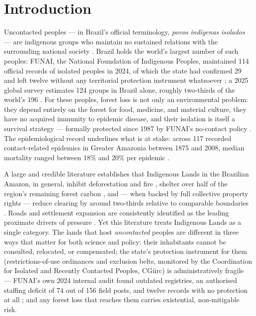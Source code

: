 \section{Introduction}\label{sec:intro}

Uncontacted peoples --- in Brazil's official terminology, \emph{povos ind\'igenas isolados} --- are indigenous groups who maintain no sustained relations with the surrounding national society \citep{pringle2014,survival2025}. Brazil holds the world's largest number of such peoples: FUNAI, the National Foundation of Indigenous Peoples, maintained 114 official records of isolated peoples in 2024, of which the state had confirmed 29 and left twelve without any territorial protection instrument whatsoever \citep{funai_audit_2024}; a 2025 global survey estimates 124 groups in Brazil alone, roughly two-thirds of the world's 196 \citep{survival2025}. For these peoples, forest loss is not only an environmental problem: they depend entirely on the forest for food, medicine, and material culture, they have no acquired immunity to epidemic disease, and their isolation is itself a survival strategy --- formally protected since 1987 by FUNAI's no-contact policy \citep{pringle2014}. The epidemiological record underlines what is at stake: across 117 recorded contact-related epidemics in Greater Amazonia between 1875 and 2008, median mortality ranged between 18\% and 20\% per epidemic \citep{walker2015}.

A large and credible literature establishes that Indigenous Lands in the Brazilian Amazon, in general, inhibit deforestation and fire \citep{nepstad2006}, shelter over half of the region's remaining forest carbon \citep{soaresfilho2010}, and --- when backed by full collective property rights --- reduce clearing by around two-thirds relative to comparable boundaries \citep{baragwanath2020,blackman2017,baragwanath2023}. Roads and settlement expansion are consistently identified as the leading proximate drivers of pressure \citep{barber2014,andrade2021,ferrante2020}. Yet this literature treats Indigenous Lands as a single category. The lands that host \emph{uncontacted} peoples are different in three ways that matter for both science and policy: their inhabitants cannot be consulted, relocated, or compensated; the state's protection instrument for them (restrictions-of-use ordinances and exclusion belts, monitored by the Coordination for Isolated and Recently Contacted Peoples, CGiirc) is administratively fragile --- FUNAI's own 2024 internal audit found outdated registries, an authorised staffing deficit of 74 out of 156 field posts, and twelve records with no protection at all \citep{funai_audit_2024}; and any forest loss that reaches them carries existential, non-mitigable risk.

